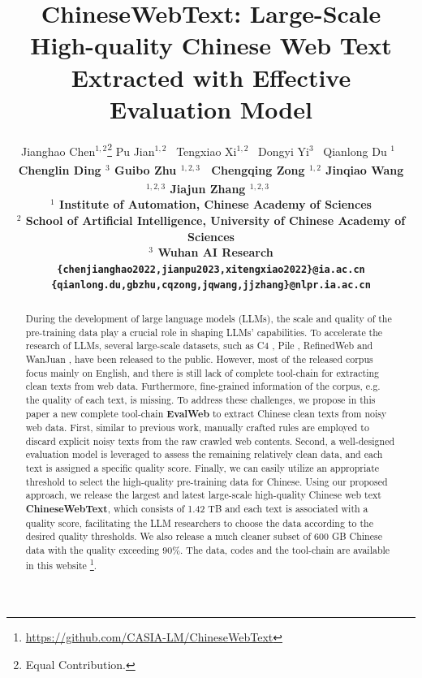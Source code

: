 \documentclass{article}
\title{{\bf{ChineseWebText}}: Large-Scale High-quality Chinese Web Text Extracted with Effective Evaluation Model}
\date{} 					%
\author{
Jianghao Chen$^{1,2}$\thanks{Equal Contribution.} \quad
Pu Jian$^{1,2}$~\footnotemark[1] \quad
Tengxiao Xi$^{1,2}$~\footnotemark[1] \quad
Dongyi Yi$^{3}$~\footnotemark[1] \quad
Qianlong Du $^{1}$~\footnotemark[1] \quad \\
\bf{Chenglin Ding} $^{3}$ \quad
\bf{Guibo Zhu} $^{1,2,3}$\textsuperscript{\Letter}~ \quad
\bf{Chengqing Zong} $^{1,2}$ \quad
\bf{Jinqiao Wang} $^{1,2,3}$\quad
\bf{Jiajun Zhang} $^{1,2,3}$\textsuperscript{\Letter}~ \quad
\\
\small{$^1$ Institute of Automation, Chinese Academy of Sciences }\quad \\
\small{$^2$ School of Artificial Intelligence, University of Chinese Academy of Sciences }\\
\small{$^3$ Wuhan AI Research }\\
\texttt{\{chenjianghao2022,jianpu2023,xitengxiao2022\}@ia.ac.cn}\\
\texttt{\{qianlong.du,gbzhu,cqzong,jqwang,jjzhang\}@nlpr.ia.ac.cn}\\
}
\begin{document}
\maketitle

\begin{abstract}

    During the development of large language models (LLMs), the scale and quality of the pre-training data play a crucial role in shaping LLMs' capabilities. To accelerate the research of LLMs, several large-scale datasets, such as C4 \cite{2020T5C4}, Pile \cite{2020_pile}, RefinedWeb \cite{2023refinedweb} and WanJuan \cite{2023wanjuan}, have been released to the public. However, most of the released corpus focus mainly on English, and there is still lack of complete tool-chain for extracting clean texts from web data. Furthermore, fine-grained information of the corpus, e.g. the quality of each text, is missing. To address these challenges, we propose in this paper a new complete tool-chain \textbf{EvalWeb} to extract Chinese clean texts from noisy web data. First, similar to previous work, manually crafted rules are employed to discard explicit noisy texts from the raw crawled web contents. Second, a well-designed evaluation model is leveraged to assess the remaining relatively clean data, and each text is assigned a specific quality score. Finally, we can easily utilize an appropriate threshold to select the high-quality pre-training data for Chinese. Using our proposed approach, we release the largest and latest large-scale high-quality Chinese web text \textbf{ChineseWebText}, which consists of 1.42 TB and each text is associated with a quality score, facilitating the LLM researchers to choose the data according to the desired quality thresholds. We also release a much cleaner subset of 600 GB Chinese data with the quality exceeding 90\%. The data, codes and the tool-chain are available in this website \footnote{\url{https://github.com/CASIA-LM/ChineseWebText}}.
    

\end{abstract}
\end{document}
